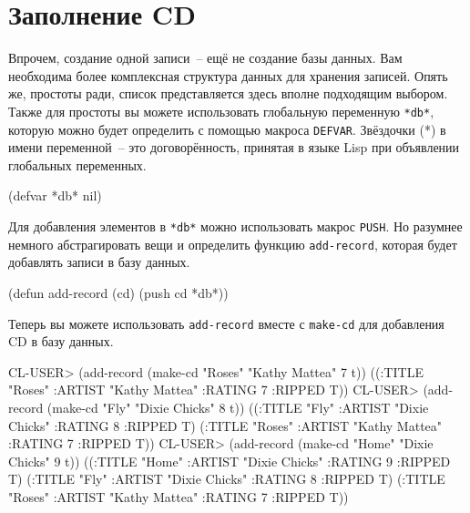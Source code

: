 \section{Заполнение CD}

Впрочем, создание одной записи~-- ещё не создание базы данных. Вам необходима более
комплексная структура данных для хранения записей. Опять же, простоты ради, список
представляется здесь вполне подходящим выбором. Также для простоты вы можете использовать
глобальную переменную \lstinline{*db*}, которую можно будет определить с помощью макроса
\lstinline{DEFVAR}. Звёздочки (*) в имени переменной~-- это договорённость, принятая в языке
Lisp при объявлении глобальных переменных.

\begin{myverb}
(defvar *db* nil)
\end{myverb}

Для добавления элементов в \lstinline{*db*} можно использовать макрос \lstinline{PUSH}. Но
разумнее немного абстрагировать вещи и определить функцию \lstinline{add-record}, которая будет
добавлять записи в базу данных.

\begin{myverb}
(defun add-record (cd) (push cd *db*))
\end{myverb}

Теперь вы можете использовать \lstinline{add-record} вместе с \lstinline{make-cd} для добавления CD
в базу данных.

\begin{myverb}
CL-USER> (add-record (make-cd "Roses" "Kathy Mattea" 7 t))
((:TITLE "Roses" :ARTIST "Kathy Mattea" :RATING 7 :RIPPED T))
CL-USER> (add-record (make-cd "Fly" "Dixie Chicks" 8 t))
((:TITLE "Fly" :ARTIST "Dixie Chicks" :RATING 8 :RIPPED T)
 (:TITLE "Roses" :ARTIST "Kathy Mattea" :RATING 7 :RIPPED T))
CL-USER> (add-record (make-cd "Home" "Dixie Chicks" 9 t))
((:TITLE "Home" :ARTIST "Dixie Chicks" :RATING 9 :RIPPED T)
 (:TITLE "Fly" :ARTIST "Dixie Chicks" :RATING 8 :RIPPED T)
 (:TITLE "Roses" :ARTIST "Kathy Mattea" :RATING 7 :RIPPED T))
\end{myverb}

